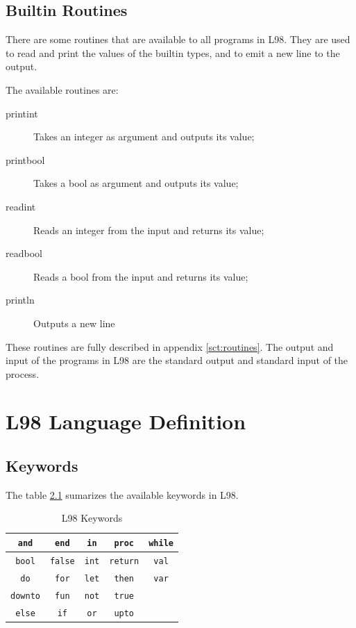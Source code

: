 \documentclass[a4paper, 11pt]{report}
\newcommand{\keyword}[1]{\texttt{#1}}
\begin{document}
\section{Builtin Routines}
\label{sct:builtin}

There are some routines that are available to all programs in L98. They are used
to read and print the values of the builtin types, and to emit a new line to the output.

The available routines are:

\begin{description}
\item[printint] Takes an integer as argument and outputs its value;

\item[printbool] Takes a bool as argument and outputs its value;

\item[readint] Reads an integer from the input and returns its value;

\item[readbool] Reads a bool from the input and returns its value;

\item[println] Outputs a new line
\end{description}

These routines are fully described in appendix \ref{sct:routines}.
The output and input of the programs in L98 are the standard output and
standard input of the process.

\appendix

\chapter{L98 Language Definition}
\section{Keywords}
The table \ref{tbl:keys} sumarizes the available keywords in L98.

\begin{table}[htb]
\center
\begin{tabular}{|c|c|c|c|c|}
 \hline
 \keyword{and} & \keyword{end} & \keyword{in} & \keyword{proc} & \keyword{while}\\
 \hline
 \keyword{bool} & \keyword{false} & \keyword{int} & \keyword{return} & \keyword{val}\\
 \hline
 \keyword{do} & \keyword{for} & \keyword{let} & \keyword{then} & \keyword{var}\\
 \hline
 \keyword{downto} & \keyword{fun} & \keyword{not} & \keyword{true} &\\
 \hline
 \keyword{else} & \keyword{if} & \keyword{or} & \keyword{upto} &\\
 \hline
\end{tabular}
\caption{L98 Keywords}
\label{tbl:keys}
\end{table}
\end{document}
